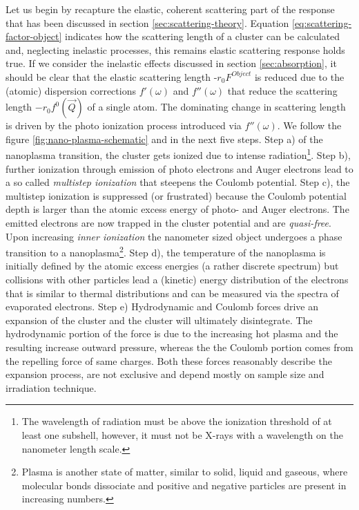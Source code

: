  Let us begin by recapture the elastic, coherent scattering part of the response that has been discussed in section \ref{sec:scattering-theory}. Equation \eqref{eq:scattering-factor-object} indicates how the scattering length of a cluster can be calculated and, neglecting inelastic processes, this remains elastic scattering response holds true. If we consider the inelastic effects discussed in section \ref{sec:absorption}, it should be clear that the elastic scattering length -$r_{0}F^{Object}$ is reduced due to the (atomic) dispersion corrections $f'\left(\omega\right)$ and $f''\left(\omega\right)$ that reduce the scattering length $-r_{0}f^{0}\left(\vec{Q}\right)$ of a single atom. The dominating change in scattering length is driven by the photo ionization process introduced via $f''\left(\omega\right)$. We follow the figure \ref{fig:nano-plasma-schematic} and \citep{Arbeiter-2011-NJP} in the next five steps. Step a) of the nanoplasma transition, the cluster gets ionized due to intense radiation\footnote{The wavelength of radiation must be above the ionization threshold of at least one subshell, however, it must not be X-rays with a wavelength on the nanometer length scale.}. Step b), further ionization through emission of photo electrons and Auger electrons lead to a so called \textit{multistep ionization} that steepens the Coulomb potential. Step c), the multistep ionization is suppressed (or frustrated) because the Coulomb potential depth is larger than the atomic excess energy of photo- and Auger electrons. The emitted electrons are now trapped in the cluster potential and are \textit{quasi-free}. Upon increasing \textit{inner ionization} the nanometer sized object undergoes a phase transition to a nanoplasma\footnote{Plasma is another state of matter, similar to solid, liquid and gaseous, where molecular bonds dissociate and positive and negative particles are present in increasing numbers.}. Step d), the temperature of the nanoplasma is initially defined by the atomic excess energies (a rather discrete spectrum) but collisions with other particles lead a (kinetic) energy distribution of the electrons that is similar to thermal distributions and can be measured via the spectra of evaporated electrons. Step e) Hydrodynamic and Coulomb forces drive an expansion of the cluster and the cluster will ultimately disintegrate. The hydrodynamic portion of the force is due to the increasing hot plasma and the resulting increase outward pressure, whereas the the Coulomb portion comes from the repelling force of same charges. Both these forces reasonably describe the expansion process, are not exclusive and depend mostly on sample size and irradiation technique.\\
